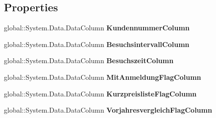 \subsection*{Properties}
\begin{DoxyCompactItemize}
\item 
global\+::\+System.\+Data.\+Data\+Column {\bfseries Kundennummer\+Column}\hypertarget{class_products_1_1_data_1_1ds_sage_1_1_kunde_data_table_a3d30ca7375dd92cff7b9a5a3087b02af}{}\label{class_products_1_1_data_1_1ds_sage_1_1_kunde_data_table_a3d30ca7375dd92cff7b9a5a3087b02af}

\item 
global\+::\+System.\+Data.\+Data\+Column {\bfseries Besuchsintervall\+Column}\hypertarget{class_products_1_1_data_1_1ds_sage_1_1_kunde_data_table_a5ae0f51e6bf75cd068fe0a12b222283f}{}\label{class_products_1_1_data_1_1ds_sage_1_1_kunde_data_table_a5ae0f51e6bf75cd068fe0a12b222283f}

\item 
global\+::\+System.\+Data.\+Data\+Column {\bfseries Besuchszeit\+Column}\hypertarget{class_products_1_1_data_1_1ds_sage_1_1_kunde_data_table_acd9e1eacf0eedd525cd21d686a71d9f9}{}\label{class_products_1_1_data_1_1ds_sage_1_1_kunde_data_table_acd9e1eacf0eedd525cd21d686a71d9f9}

\item 
global\+::\+System.\+Data.\+Data\+Column {\bfseries Mit\+Anmeldung\+Flag\+Column}\hypertarget{class_products_1_1_data_1_1ds_sage_1_1_kunde_data_table_a38e2f7b2cc507065e7e7f0fe8f74c80c}{}\label{class_products_1_1_data_1_1ds_sage_1_1_kunde_data_table_a38e2f7b2cc507065e7e7f0fe8f74c80c}

\item 
global\+::\+System.\+Data.\+Data\+Column {\bfseries Kurzpreisliste\+Flag\+Column}\hypertarget{class_products_1_1_data_1_1ds_sage_1_1_kunde_data_table_a0cffbc12171e8884fe89ccece5b7a0dd}{}\label{class_products_1_1_data_1_1ds_sage_1_1_kunde_data_table_a0cffbc12171e8884fe89ccece5b7a0dd}

\item 
global\+::\+System.\+Data.\+Data\+Column {\bfseries Vorjahresvergleich\+Flag\+Column}\hypertarget{class_products_1_1_data_1_1ds_sage_1_1_kunde_data_table_a47bdb9859c38fd89c39959404d4f181a}{}\label{class_products_1_1_data_1_1ds_sage_1_1_kunde_data_table_a47bdb9859c38fd89c39959404d4f181a}


\end{DoxyCompactItemize}
